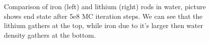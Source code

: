 \begin{figure}[h]
\begin{minipage}[t]{0.45\textwidth}
  \end{minipage}
  \caption{Comparison of iron (left) and lithium (right) rods in water, picture shows end state after 5e8 MC iteration steps. We can see that the lithium gathers at the top, while iron due to it's larger then water density gathers at the bottom.}
  \label{fig:med_comp1}
\end{figure}

